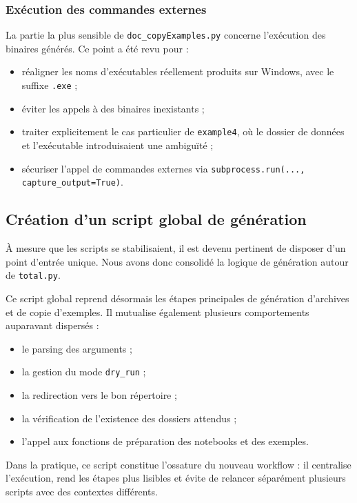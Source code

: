 \documentclass[a4paper,12pt,twoside]{article}
\begin{document}
\subsubsection{Exécution des commandes externes}

La partie la plus sensible de \texttt{doc\_copyExamples.py} concerne l'exécution des binaires générés. Ce point a été revu pour :
\begin{itemize}
    \item réaligner les noms d'exécutables réellement produits sur Windows, avec le suffixe \texttt{.exe} ;
    \item éviter les appels à des binaires inexistants ;
    \item traiter explicitement le cas particulier de \texttt{example4}, où le dossier de données et l'exécutable introduisaient une ambiguïté ;
    \item sécuriser l'appel de commandes externes via \texttt{subprocess.run(..., capture\_output=True)}.
\end{itemize}

\subsection{Création d'un script global de génération}

À mesure que les scripts se stabilisaient, il est devenu pertinent de disposer d'un point d'entrée unique. Nous avons donc consolidé la logique de génération autour de \texttt{total.py}.

Ce script global reprend désormais les étapes principales de génération d'archives et de copie d'exemples. Il mutualise également plusieurs comportements auparavant dispersés :
\begin{itemize}
    \item le parsing des arguments ;
    \item la gestion du mode \texttt{dry\_run} ;
    \item la redirection vers le bon répertoire ;
    \item la vérification de l'existence des dossiers attendus ;
    \item l'appel aux fonctions de préparation des notebooks et des exemples.
\end{itemize}

Dans la pratique, ce script constitue l'ossature du nouveau workflow : il centralise l'exécution, rend les étapes plus lisibles et évite de relancer séparément plusieurs scripts avec des contextes différents.
\end{document}
